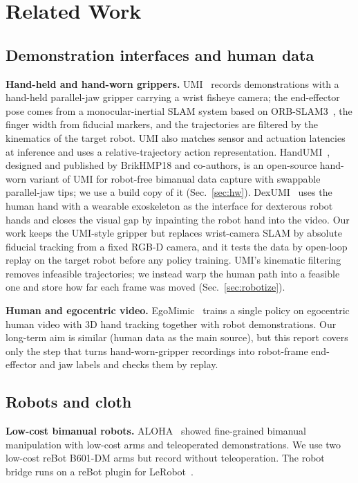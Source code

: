 \documentclass[conference,10pt]{IEEEtran}
\begin{document}
\section{Related Work}\label{sec:related}
\subsection{Demonstration interfaces and human data}
\textbf{Hand-held and hand-worn grippers.} UMI~\cite{chi2024umi} records demonstrations with a hand-held parallel-jaw
gripper carrying a wrist fisheye camera; the end-effector pose comes from a monocular-inertial SLAM system based on
ORB-SLAM3~\cite{campos2021orbslam3}, the finger width from fiducial markers, and the trajectories are filtered by the
kinematics of the target robot. UMI also matches sensor and actuation latencies at inference and uses a relative-trajectory
action representation. HandUMI~\cite{handumi,meza2026handumi}, designed and published by BrikHMP18 and co-authors, is an
open-source hand-worn variant of UMI for robot-free bimanual data capture with swappable parallel-jaw tips; we use a build
copy of it (Sec.~\ref{sec:hw}). DexUMI~\cite{xu2025dexumi} uses the human hand with a wearable exoskeleton as the interface
for dexterous robot hands and closes the visual gap by inpainting the robot hand into the video. Our work keeps the
UMI-style gripper but replaces wrist-camera SLAM by absolute fiducial tracking from a fixed RGB-D camera, and it tests the
data by open-loop replay on the target robot before any policy training. UMI's kinematic filtering removes infeasible
trajectories; we instead warp the human path into a feasible one and store how far each frame was moved
(Sec.~\ref{sec:robotize}).

\textbf{Human and egocentric video.} EgoMimic~\cite{kareer2025egomimic} trains a single policy on egocentric human video
with 3D hand tracking together with robot demonstrations. Our long-term aim is similar (human data as the main source),
but this report covers only the step that turns hand-worn-gripper recordings into robot-frame end-effector and jaw labels
and checks them by replay.

\subsection{Robots and cloth}
\textbf{Low-cost bimanual robots.} ALOHA~\cite{zhao2023aloha} showed fine-grained bimanual manipulation with low-cost arms
and teleoperated demonstrations. We use two low-cost reBot B601-DM arms but record without teleoperation. The robot bridge
runs on a reBot plugin for LeRobot~\cite{cadene2024lerobot}.
\end{document}
